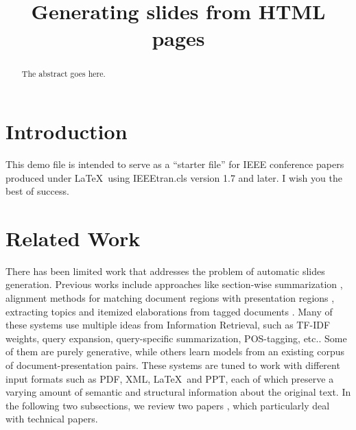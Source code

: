 \documentclass[conference]{IEEEtran}
\begin{document}
%
\title{Generating slides from HTML pages}


\author{
\and
{}
\and
{}
}


\maketitle


\begin{abstract}
The abstract goes here.
\end{abstract}


\section{Introduction}
This demo file is intended to serve as a ``starter file''
for IEEE conference papers produced under \LaTeX\ using
IEEEtran.cls version 1.7 and later.
I wish you the best of success. \cite{test}

\section{Related Work}
There has been limited work that addresses the problem of automatic slides generation.
Previous works include approaches like section-wise summarization \cite{sravanthi}, alignment methods for matching document regions with presentation regions \cite{brandon}, extracting topics and itemized elaborations from tagged documents \cite{utiyama}.
Many of these systems use multiple ideas from Information Retrieval, such as TF-IDF weights, query expansion, query-specific summarization, POS-tagging, etc..
Some of them are purely generative, while others learn models from an existing corpus of document-presentation pairs.
These systems are tuned to work with different input formats such as PDF, XML, \LaTeX\ and PPT, each of which preserve a varying amount of semantic and structural information about the original text.
In the following two subsections, we review two papers \cite{sravanthi},\cite{brandon} which particularly deal with technical papers.
\end{document}
